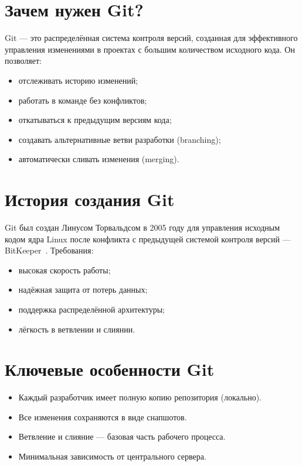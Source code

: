 \documentclass[a4paper,12pt]{report}
\begin{document}
\section{Зачем нужен Git?}
Git — это распределённая система контроля версий, созданная для эффективного управления изменениями в проектах с большим количеством исходного кода. Он позволяет:
\begin{itemize}[noitemsep]
    \item отслеживать историю изменений;
    \item работать в команде без конфликтов;
    \item откатываться к предыдущим версиям кода;
    \item создавать альтернативные ветви разработки (branching);
    \item автоматически сливать изменения (merging).
\end{itemize}

\section{История создания Git}
Git был создан Линусом Торвальдсом в 2005 году для управления исходным кодом ядра Linux после конфликта с предыдущей системой контроля версий — BitKeeper~\cite{progit_book}. Требования:
\begin{itemize}[noitemsep]
    \item высокая скорость работы;
    \item надёжная защита от потерь данных;
    \item поддержка распределённой архитектуры;
    \item лёгкость в ветвлении и слиянии.
\end{itemize}

\section{Ключевые особенности Git}
\begin{itemize}[noitemsep]
    \item Каждый разработчик имеет полную копию репозитория (локально).
    \item Все изменения сохраняются в виде снапшотов.
    \item Ветвление и слияние — базовая часть рабочего процесса.
    \item Минимальная зависимость от центрального сервера.
\end{itemize}
\end{document}
